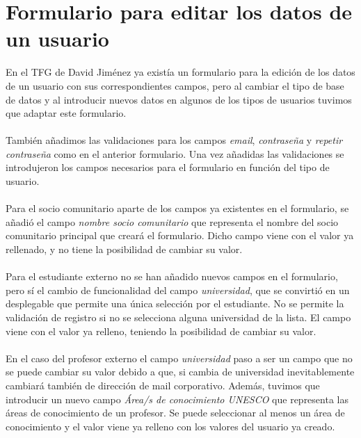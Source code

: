 \documentclass[11pt]{book}
\begin{document}
	\section{Formulario para editar los datos de un usuario}
	En el TFG de David Jiménez ya existía un formulario para la edición de los datos de un usuario con sus correspondientes campos, pero al cambiar el tipo de base de datos y al introducir nuevos datos en algunos de los tipos de usuarios tuvimos que adaptar este formulario. \\\\
	También añadimos las validaciones para los campos \emph{email}, \emph{contraseña} y \emph{repetir contraseña} como en el anterior formulario. Una vez añadidas las validaciones se introdujeron los campos necesarios para el formulario en función del tipo de usuario.\\\\
	Para el socio comunitario aparte de los campos ya existentes en el formulario, se añadió el campo \emph{nombre socio comunitario} que representa el nombre del socio comunitario principal que creará el formulario. Dicho campo viene con el valor ya rellenado, y no tiene la posibilidad de cambiar su valor.\\\\
	Para el estudiante externo no se han añadido nuevos campos en el formulario, pero sí el cambio de funcionalidad del campo \emph{universidad}, que se convirtió en un desplegable que permite una única selección por el estudiante.  No se permite la validación de registro si no se selecciona alguna universidad de la lista. El campo viene con el valor ya relleno, teniendo la posibilidad de cambiar su valor.\\\\
	En el caso del profesor externo el campo \emph{universidad} paso a ser un campo que no se puede cambiar su valor debido a que, si cambia de universidad inevitablemente cambiará también de dirección de mail corporativo. Además, tuvimos que introducir un nuevo campo \emph{Área/s de conocimiento UNESCO} que representa las áreas de conocimiento de un profesor. Se puede seleccionar al menos un área de conocimiento y el valor viene ya relleno con los valores del usuario ya creado.
	
	
	
\end{document}
